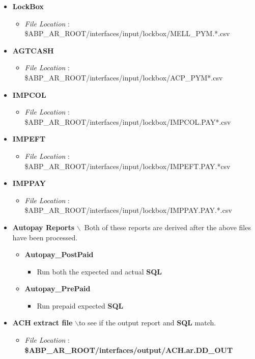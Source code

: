 \documentclass[12pt,twoside]{article}
\begin{document}
\begin{itemize}
\item \textbf{LockBox}
\begin{itemize}
\item \emph{File Location} :
\$ABP\_AR\_ROOT/interfaces/input/lockbox/MELL\_PYM.*.csv
\end{itemize}
\item \textbf{AGTCASH}
\begin{itemize}
\item \emph{File Location} :
\$ABP\_AR\_ROOT/interfaces/input/lockbox/ACP\_PYM*.csv
\end{itemize}
\item \textbf{IMPCOL}
\begin{itemize}
\item \emph{File Location} :
\$ABP\_AR\_ROOT/interfaces/input/lockbox/IMPCOL.PAY*.csv
\end{itemize}
\item \textbf{IMPEFT}
\begin{itemize}
\item \emph{File Location} :
\$ABP\_AR\_ROOT/interfaces/input/lockbox/IMPEFT.PAY.*csv
\end{itemize}
\item \textbf{IMPPAY}
\begin{itemize}
\item \emph{File Location} :
\$ABP\_AR\_ROOT/interfaces/input/lockbox/IMPPAY.PAY.*.csv
\end{itemize}
\item \textbf{Autopay Reports} $\backslash$\ Both of these reports are derived after
the above files have been processed.
\begin{itemize}
\item \textbf{Autopay\_PostPaid}
\begin{itemize}
\item Run both the expected and actual \textbf{SQL}
\end{itemize}
\item \textbf{Autopay\_PrePaid}
\begin{itemize}
\item Run prepaid expected \textbf{SQL}
\end{itemize}
\end{itemize}
\item \textbf{ACH extract file} $\backslash$\Check to see if the output report and
\textbf{SQL} match.
\begin{itemize}
\item \emph{File Location} :
\textbf{\$ABP\_AR\_ROOT/interfaces/output/ACH.ar.DD\_OUT} \\
\end{itemize}
\end{itemize}
\end{document}
